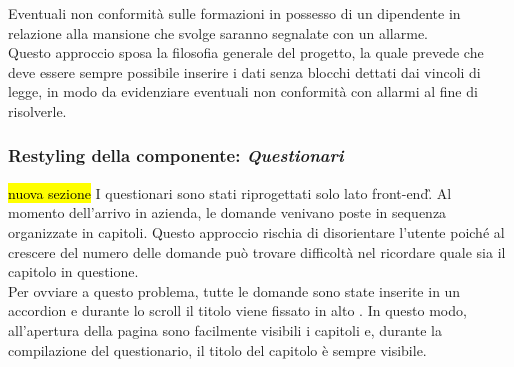 Eventuali non conformità sulle formazioni in possesso di un dipendente in relazione alla mansione che svolge saranno segnalate con un allarme. \\
 Questo approccio sposa la filosofia generale del progetto, la quale prevede che deve essere sempre possibile inserire i dati senza blocchi dettati dai vincoli di legge, in modo da evidenziare eventuali non conformità con allarmi al fine di risolverle.
\newpage
\subsubsection{Restyling della componente: \textit{Questionari}}
\hl{nuova sezione}
I questionari sono stati riprogettati solo lato \gls{front-end}\G.
Al momento dell'arrivo in azienda, le domande venivano poste in sequenza organizzate in capitoli. Questo approccio rischia di disorientare l'utente poiché al crescere del numero delle domande può trovare difficoltà nel ricordare quale sia il capitolo in questione. \\
Per ovviare a questo problema, tutte le domande sono state inserite  in un accordion e durante lo scroll il titolo viene fissato in alto . In questo modo, all'apertura della pagina sono facilmente visibili i capitoli e, durante la compilazione del questionario, il titolo del capitolo è sempre visibile.\\

